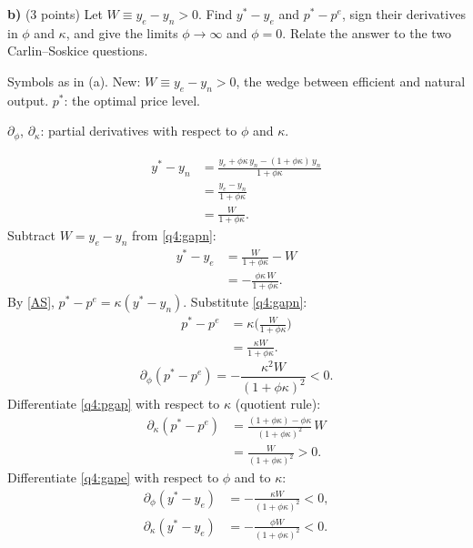 \textbf{b)} (3 points) Let $W\equiv y_e-y_n>0$. Find $y^*-y_e$ and $p^*-p^e$, sign their derivatives in $\phi$ and $\kappa$, and give the limits
$\phi\to\infty$ and $\phi=0$. Relate the answer to the two Carlin--Soskice questions.
\resolespaco
\begin{sol}
\begin{notacao}
\item Symbols as in (a). New: $W\equiv y_e-y_n>0$, the wedge between efficient and natural output. $p^*$: the optimal price level.
\item $\partial_\phi$, $\partial_\kappa$: partial derivatives with respect to $\phi$ and $\kappa$.
\end{notacao}
\begin{align}
y^*-y_n&=\frac{y_e+\phi\kappa\,y_n-(1+\phi\kappa)\,y_n}{1+\phi\kappa}\nonumber\\
&=\frac{y_e-y_n}{1+\phi\kappa}\nonumber\\
&=\frac{W}{1+\phi\kappa}. \label{q4:gapn}
\end{align}
Subtract $W=y_e-y_n$ from \eqref{q4:gapn}:
\begin{align}
y^*-y_e&=\frac{W}{1+\phi\kappa}-W\nonumber\\
&=-\frac{\phi\kappa\,W}{1+\phi\kappa}. \label{q4:gape}
\end{align}
By \eqref{AS}, $p^*-p^e=\kappa(y^*-y_n)$. Substitute \eqref{q4:gapn}:
\begin{align}
p^*-p^e&=\kappa\Big(\frac{W}{1+\phi\kappa}\Big)\nonumber\\
&=\frac{\kappa W}{1+\phi\kappa}. \label{q4:pgap}
\end{align}
\begin{equation}
\partial_\phi(p^*-p^e)=-\frac{\kappa^2W}{(1+\phi\kappa)^2}<0 . \nonumber
\end{equation}
Differentiate \eqref{q4:pgap} with respect to $\kappa$ (quotient rule):
\begin{align*}
\partial_\kappa(p^*-p^e)&=\frac{(1+\phi\kappa)-\phi\kappa}{(1+\phi\kappa)^2}\,W\\
&=\frac{W}{(1+\phi\kappa)^2}>0 .
\end{align*}
Differentiate \eqref{q4:gape} with respect to $\phi$ and to $\kappa$:
\begin{align*}
\partial_\phi(y^*-y_e)&=-\frac{\kappa W}{(1+\phi\kappa)^2}<0 ,\\
\partial_\kappa(y^*-y_e)&=-\frac{\phi W}{(1+\phi\kappa)^2}<0 .

\end{align*}
\end{sol}
